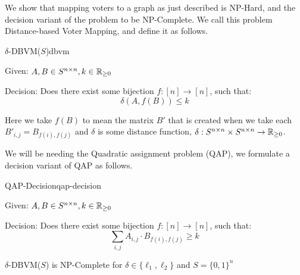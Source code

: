 We show that mapping voters to a graph as just described is NP-Hard, and the decision variant of the problem to be NP-Complete. We call this problem Distance-based Voter Mapping, and define it as follows.


\begin{problem}{$\delta$-DBVM($S$)}{dbvm}
{Given: $A, B \in S^{n \times n}, k\in\mathbb{R}_{\geq 0}$

Decision: Does there exist some bijection $f: [n] \to [n]$, such that: $$\delta(A, f(B)) \leq k$$}

Here we take $f(B)$ to mean the matrix $B'$ that is created when we take each $B'_{i,j} = B_{f(i),f(j)}$ and  $\delta$ is some distance function, $\delta: {S^{n \times n} \times S^{n \times n} \to \mathbb{R}_{\geq 0}}$.
\end{problem}

We will be needing the Quadratic assignment problem (QAP), we formulate a decision variant of QAP as follows.

\begin{problem}{QAP-Decision}{qap-decision}
{Given: $A, B \in S^{n \times n}, k\in\mathbb{R}_{\geq 0}$

Decision: Does there exist some bijection $f: [n] \to [n]$, such that: $$\sum_{i,j} A_{i,j}\cdot B_{f(i),f(j)} \geq k$$}
\end{problem}

\begin{theorem}
	$\delta$-DBVM($S$) is NP-Complete for $\delta\in\{\ell_1, \ell_2\}$ and $S = \{0,1\}^n$
	\label{thm:np_hard_voter_mapping_l2}
\end{theorem}


